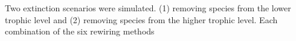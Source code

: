 \documentclass[12pt,a4paper]{article}
\begin{document}
			
Two extinction scenarios were simulated. (1) removing species from the lower trophic level and (2) removing species from the higher trophic level. Each combination of the six rewiring methods
 
\end{document}
